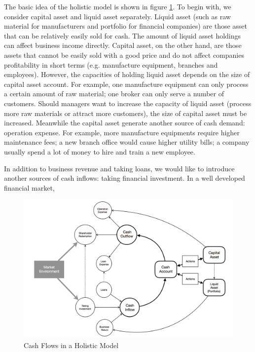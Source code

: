 \documentclass[12pt]{article}
\begin{document}
The basic idea of the holistic model is shown in figure \ref{Holistic}. To begin with, we consider capital asset and liquid asset separately. Liquid asset (such as raw material for manufacturers and portfolio for financial companies) are those asset that can be relatively easily sold for cash. The amount of liquid asset holdings can affect business income directly. Capital asset, on the other hand, are those assets that cannot be easily sold with a good price and do not affect companies profitability in short terms (e.g. manufacture equipment, branches and employees). However, the capacities of holding liquid asset depends on the size of capital asset account. For example, one manufacture equipment can only process a certain amount of raw material; one broker can only serve a number of customers. Should managers want to increase the capacity of liquid asset (process more raw materials or attract more customers), the size of capital asset must be increased. Meanwhile the capital asset generate another source of cash demand: operation expense. For example, more manufacture equipments require higher maintenance fees; a new branch office would cause higher utility bills; a company usually spend a lot of money to hire and train a new employee. 

In addition to business revenue and taking loans, we would like to introduce another sources of cash inflows: taking financial investment. In a well developed financial market, 



\begin{figure}
\begin{center}
\includegraphics[scale=.33]{Holistic}
\end{center}
\caption{Cash Flows in a Holistic Model}
\label{Holistic}
\end{figure}
\end{document}
